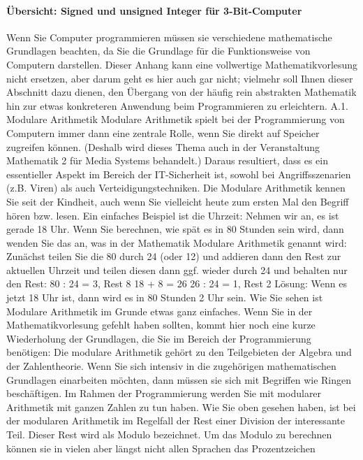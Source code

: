 \paragraph{Übersicht: Signed und unsigned Integer für 3-Bit-Computer}
Wenn Sie Computer programmieren müssen sie verschiedene mathematische Grundlagen beachten, da Sie die Grundlage für die Funktionsweise von Computern darstellen. Dieser Anhang kann eine vollwertige Mathematikvorlesung nicht ersetzen, aber darum geht es hier auch gar nicht; vielmehr soll Ihnen dieser Abschnitt dazu dienen, den Übergang von der häufig rein abstrakten Mathematik hin zur etwas konkreteren Anwendung beim Programmieren zu erleichtern.
A.1. Modulare Arithmetik
Modulare Arithmetik spielt bei der Programmierung von Computern immer dann eine zentrale Rolle, wenn Sie direkt auf Speicher zugreifen können. (Deshalb wird dieses Thema auch in der Veranstaltung Mathematik 2 für Media Systems behandelt.) Daraus resultiert, dass es ein essentieller Aspekt im Bereich der IT-Sicherheit ist, sowohl bei Angriffsszenarien (z.B. Viren) als auch Verteidigungstechniken.
Die Modulare Arithmetik kennen Sie seit der Kindheit, auch wenn Sie vielleicht heute zum ersten Mal den Begriff hören bzw. lesen. Ein einfaches Beispiel ist die Uhrzeit: Nehmen wir an, es ist gerade 18 Uhr. Wenn Sie berechnen, wie spät es in 80 Stunden sein wird, dann wenden Sie das an, was in der Mathematik Modulare Arithmetik genannt wird:
Zunächst teilen Sie die 80 durch 24 (oder 12) und addieren dann den Rest zur aktuellen Uhrzeit und teilen diesen dann ggf. wieder durch 24 und behalten nur den Rest: 
80 : 24 = 3, Rest 8
18 + 8 = 26
26 : 24 = 1, Rest 2
Lösung: Wenn es jetzt 18 Uhr ist, dann wird es in 80 Stunden 2 Uhr sein.
Wie Sie sehen ist Modulare Arithmetik im Grunde etwas ganz einfaches. Wenn Sie in der Mathematikvorlesung gefehlt haben sollten, kommt hier noch eine kurze Wiederholung der Grundlagen, die Sie im Bereich der Programmierung benötigen:
Die modulare Arithmetik gehört zu den Teilgebieten der Algebra und der Zahlentheorie. Wenn Sie sich intensiv in die zugehörigen mathematischen Grundlagen einarbeiten möchten, dann müssen sie sich mit Begriffen wie Ringen beschäftigen. Im Rahmen der Programmierung werden Sie mit modularer Arithmetik mit ganzen Zahlen zu tun haben.
Wie Sie oben gesehen haben, ist bei der modularen Arithmetik im Regelfall der Rest einer Division der interessante Teil. Dieser Rest wird als Modulo bezeichnet. Um das Modulo zu berechnen können sie in vielen aber längst nicht allen Sprachen das Prozentzeichen %
